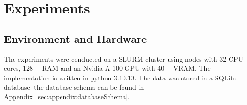 \chapter{Experiments}
\label{sec:experiments}


\section{Environment and Hardware}
\label{sec:experiments:environmentHardware}
The experiments were conducted on a SLURM cluster using nodes with \num{32} CPU cores, \SI{128}{\giga\byte} RAM and an Nvidia A-100 GPU with \SI{40}{\giga\byte} VRAM. The implementation is written in python 3.10.13. The data was stored in a SQLite database, the database schema can be found in Appendix~\ref{sec:appendix:databaseSchema}.






